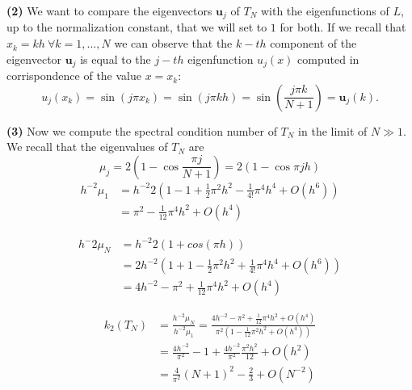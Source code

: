 \documentclass[a4paper,11pt]{article}
\begin{document}
\noindent \textbf{(2)} We want to compare the eigenvectors $\textbf{u}_j$ of $T_N$ with the eigenfunctions of $L$, up to the normalization constant, that we will set to $1$ for both. If we recall that $x_k = k h\ \forall k = 1,\dots, N$ we can observe that the $k-th$ component of the eigenvector $\textbf{u}_j$ is equal to the $j-th$ eigenfunction $u_j(x)$ computed in corrispondence of the value $x=x_k$:
\begin{equation}
	u_j(x_k) = \sin(j \pi x_k) = \sin ( j \pi k h ) = \sin\left( \frac{j \pi k}{N+1}\right)  = \textbf{u}_j(k).
\end{equation}

\noindent \textbf{(3)}  Now we compute the spectral condition number of $T_N$ in the limit of $N\gg 1$. We recall that the eigenvalues of $T_N$ are
\begin{equation}\label{key}
	\mu_j = 2\left( 1-\cos \frac{\pi j}{N+1}\right) = 2\left( 1-\cos \pi j h\right)
\end{equation}
\begin{equation}
\begin{split}
	h^{-2}\mu_1 &= h^{-2} 2 \left(  1-1 +\frac{1}{2} \pi^2 h^2 - \frac{1}{4!} \pi^4 h^4 + O(h^6)\right) \\
	& = \pi^2 -\frac{1}{12} \pi^4 h^2 + O(h^4)
\end{split}
\end{equation}

\begin{equation}
\begin{split}
	h^-2\mu_N &= h^{-2}2(1+cos(\pi h))\\
	&=2h^{-2} \left( 1 + 1 -\frac{1}{2} \pi^2 h^2 + \frac{1}{4!} \pi^4 h^4 + O(h^6)\right) \\
	&= 4 h^{-2} - \pi^2 +\frac{1}{12} \pi^4 h^2 + O(h^4)
\end{split}
\end{equation}

\begin{equation}
\begin{split}
	k_2(T_N) &= \frac{h^{-2}\mu_N}{h^{-2}\mu_1} = \frac{4 h^{-2} - \pi^2 +\frac{1}{12} \pi^4 h^2 + O(h^4)}{\pi^2(1 -\frac{1}{12} \pi^2 h^2 + O(h^4))}\\
	&= \frac{4 h^{-2}}{\pi^2} -1 + \frac{4 h^{-2}}{\pi^2} \frac{\pi^2 h^2}{12} +O(h^2)\\
	&=\frac{4}{\pi^2}(N+1)^2 - \frac{2}{3} + O(N^{-2})
\end{split}
\end{equation}
	
	
\end{document}
